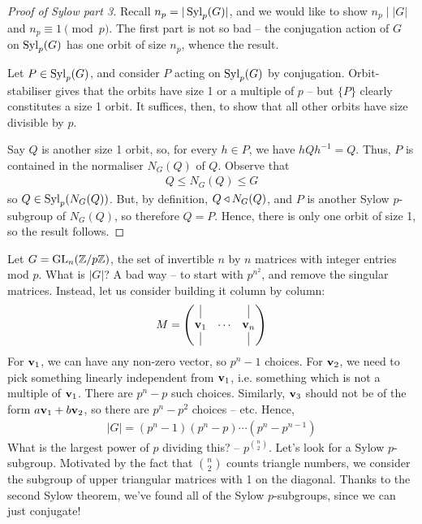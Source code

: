 \documentclass{../template/note}
\begin{document}
    \begin{proof}[Proof of Sylow part 3]
        Recall $n_p = |\operatorname{Syl}_p(G)|$, and we would like to show $n_p \mid |G|$ and $n_p \equiv 1 \pmod p$. The first part is not so bad -- the conjugation action of $G$ on $\operatorname{Syl}_p(G)$ has one orbit of size $n_p$, whence the result.

        Let $P \in \operatorname{Syl}_p(G)$, and consider $P$ acting on $\operatorname{Syl}_p(G)$ by conjugation. Orbit-stabiliser gives that the orbits have size 1 or a multiple of $p$ -- but $\{P\}$ clearly constitutes a size 1 orbit. It suffices, then, to show that all other orbits have size divisible by $p$.

        Say $Q$ is another size 1 orbit, so, for every $h \in P$, we have $hQh^{-1} = Q$. Thus, $P$ is contained in the normaliser $N_G(Q)$ of $Q$. Observe that
        \begin{align*}
            Q \leq N_G(Q) \leq G
        \end{align*}
        so $Q \in \operatorname{Syl}_p(N_G(Q))$. But, by definition, $Q \triangleleft N_G(Q)$, and $P$ is another Sylow $p$-subgroup of $N_G(Q)$, so therefore $Q=P$. Hence, there is only one orbit of size 1, so the result follows.
    \end{proof}
    
    \begin{example*}
        Let $G = \operatorname{GL}_n(\mathbb Z/p\mathbb Z)$, the set of invertible $n$ by $n$ matrices with integer entries mod $p$. What is $|G|$? A bad way -- to start with $p^{n^2}$, and remove the singular matrices. Instead, let us consider building it column by column:
        \begin{align*}
            M = \begin{pmatrix}
                \vline & & \vline \\ 
                \V v_1 & \cdots & \V v_n \\
                \vline & & \vline \\ 
            \end{pmatrix}   
        \end{align*}
        For $\V v_1$, we can have any non-zero vector, so $p^n-1$ choices. For $\V v_2$, we need to pick something linearly independent from $\V v_1$, i.e. something which is not a multiple of $\V v_1$. There are $p^n-p$ such choices. Similarly, $\V v_3$ should not be of the form $a \V v_1 + b \V v_2$, so there are $p^n - p^2$ choices -- etc. Hence,
        \begin{align*}
            |G| = (p^n-1)(p^n-p)\cdots(p^n-p^{n-1})
        \end{align*}
        What is the largest power of $p$ dividing this? -- $p^{\binom{n}{2}}$. Let's look for a Sylow $p$-subgroup. Motivated by the fact that $\binom n 2$ counts triangle numbers, we consider the subgroup of upper triangular matrices with 1 on the diagonal. Thanks to the second Sylow theorem, we've found all of the Sylow $p$-subgroups, since we can just conjugate!
    \end{example*}
\end{document}
